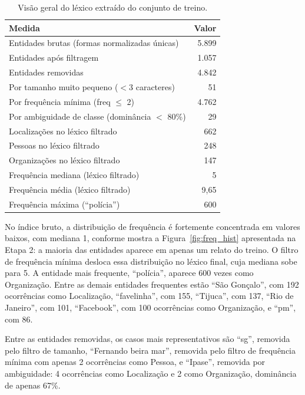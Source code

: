 \documentclass[12pt,a4paper]{article}
\begin{document}
\begin{table}[H]
\centering
\caption{Visão geral do léxico extraído do conjunto de treino.}
\label{tab:lexico}
\begin{tabular}{lr}
\toprule
\textbf{Medida} & \textbf{Valor} \\
\midrule
Entidades brutas (formas normalizadas únicas)         & 5.899 \\
Entidades após filtragem                              & 1.057 \\
Entidades removidas                                   & 4.842 \\
\quad Por tamanho muito pequeno (${<}$3 caracteres)    &    51 \\
\quad Por frequência mínima (freq $\leq$ 2)            & 4.762 \\
\quad Por ambiguidade de classe (dominância $<$ 80\%)  &    29 \\
\midrule
Localizações no léxico filtrado                       &   662 \\
Pessoas no léxico filtrado                            &   248 \\
Organizações no léxico filtrado                       &   147 \\
\midrule
Frequência mediana (léxico filtrado)                  &     5 \\
Frequência média (léxico filtrado)                    &  9,65 \\
Frequência máxima (``polícia'')                       &   600 \\
\bottomrule
\end{tabular}
\end{table}

No índice bruto, a distribuição de frequência é fortemente concentrada em
valores baixos, com mediana 1, conforme mostra a Figura~\ref{fig:freq_hist}
apresentada na Etapa 2: a maioria das entidades aparece em apenas um relato
do treino. O filtro de frequência mínima desloca essa distribuição no léxico
final, cuja mediana sobe para 5. A entidade mais frequente, ``polícia'',
aparece 600 vezes como Organização. Entre as demais entidades frequentes
estão ``São Gonçalo'', com 192 ocorrências como Localização, ``favelinha'',
com 155, ``Tijuca'', com 137, ``Rio de Janeiro'', com 101, ``Facebook'', com
100 ocorrências como Organização, e ``pm'', com 86.

Entre as entidades removidas, os casos mais representativos são ``sg'',
removida pelo filtro de tamanho, ``Fernando beira mar'', removida pelo filtro
de frequência mínima com apenas 2 ocorrências como Pessoa, e ``Ipase'',
removida por ambiguidade: 4 ocorrências como Localização e 2 como
Organização, dominância de apenas 67\%.
\end{document}
